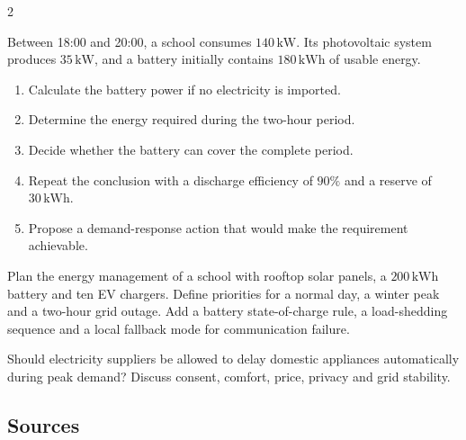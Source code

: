 \begin{multicols}{2}
\begin{applicationexercise}
Between 18:00 and 20:00, a school consumes $140\,\mathrm{kW}$. Its photovoltaic system produces
$35\,\mathrm{kW}$, and a battery initially contains $180\,\mathrm{kWh}$ of usable energy.
\begin{enumerate}
\item Calculate the battery power if no electricity is imported.
\item Determine the energy required during the two-hour period.
\item Decide whether the battery can cover the complete period.
\item Repeat the conclusion with a discharge efficiency of $90\%$ and a reserve of $30\,\mathrm{kWh}$.
\item Propose a demand-response action that would make the requirement achievable.
\end{enumerate}
\end{applicationexercise}

\begin{engineeringchallenge}
Plan the energy management of a school with rooftop solar panels, a $200\,\mathrm{kWh}$ battery and ten
EV chargers. Define priorities for a normal day, a winter peak and a two-hour grid outage. Add a battery
state-of-charge rule, a load-shedding sequence and a local fallback mode for communication failure.
\end{engineeringchallenge}

\begin{speaking}
Should electricity suppliers be allowed to delay domestic appliances automatically during peak demand?
Discuss consent, comfort, price, privacy and grid stability.
\end{speaking}
\end{multicols}

\subsection*{Sources}
